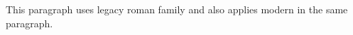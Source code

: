 This paragraph uses \rm legacy roman family and also applies \textrm{modern} in the same paragraph.

